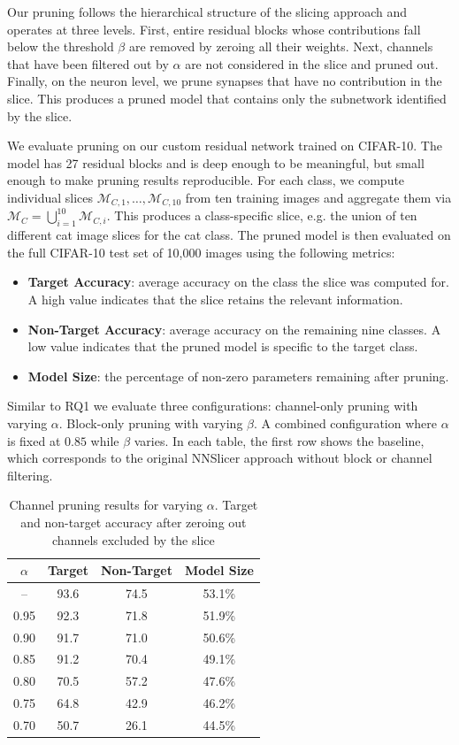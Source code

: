\documentclass[
12pt,
fancyheadings,
a4paper,
twoside,
BCOR=0.7cm,
nobcorignoretitle,
grayscalebody,
]{stsreprt}
\begin{document}
Our pruning follows the hierarchical structure of the slicing approach and operates at three
levels.
First, entire residual blocks whose contributions fall below the threshold $\beta$ are removed by
zeroing all their weights.
Next, channels that have been filtered out by $\alpha$ are not considered in the slice and pruned
out.
Finally, on the neuron level, we prune synapses that have no contribution in the slice.
This produces a pruned model that contains only the subnetwork identified by the slice.

We evaluate pruning on our custom residual network trained on CIFAR-10.
The model has 27 residual blocks and is deep enough to be meaningful, but small enough to make
pruning results reproducible.
For each class, we compute individual slices $\mathcal{M}_{C,1}, \dots, \mathcal{M}_{C,10}$ from
ten training images and aggregate them via $\mathcal{M}_C = \bigcup_{i=1}^{10} \mathcal{M}_{C,i}$.
This produces a class-specific slice, e.g. the union of ten different cat image slices for the cat
class.
The pruned model is then evaluated on the full CIFAR-10 test set of 10{,}000 images using the
following metrics:
\begin{itemize}
    \item \textbf{Target Accuracy}: average accuracy on the class the slice was computed for. A high value indicates that the slice retains the relevant information.
    \item \textbf{Non-Target Accuracy}: average accuracy on the remaining nine classes. A low value indicates that the pruned model is specific to the target class.
    \item \textbf{Model Size}: the percentage of non-zero parameters remaining after pruning.
\end{itemize}

\noindent
Similar to RQ1 we evaluate three configurations: channel-only pruning with varying $\alpha$.
Block-only pruning with varying $\beta$. A combined configuration where $\alpha$ is fixed at $0.85$
while $\beta$ varies.
In each table, the first row shows the baseline, which corresponds to the original NNSlicer
approach without block or channel filtering.

\begin{table}[ht]
\centering
\caption{Channel pruning results for varying $\alpha$. Target and non-target accuracy after zeroing out channels excluded by the slice}
\label{tab:channel_pruning}
\begin{tabular}{cccc}
\toprule
\textbf{$\alpha$} & \textbf{Target} & \textbf{Non-Target} & \textbf{Model Size} \\
\midrule
-- & 93.6 & 74.5 & 53.1\% \\
\midrule
0.95 & 92.3 & 71.8 & 51.9\% \\
0.90 & 91.7 & 71.0 & 50.6\% \\
0.85 & 91.2 & 70.4 & 49.1\% \\
0.80 & 70.5 & 57.2 & 47.6\% \\
0.75 & 64.8 & 42.9 & 46.2\% \\
0.70 & 50.7 & 26.1 & 44.5\% \\
\bottomrule
\end{tabular}
\end{table}
\end{document}
